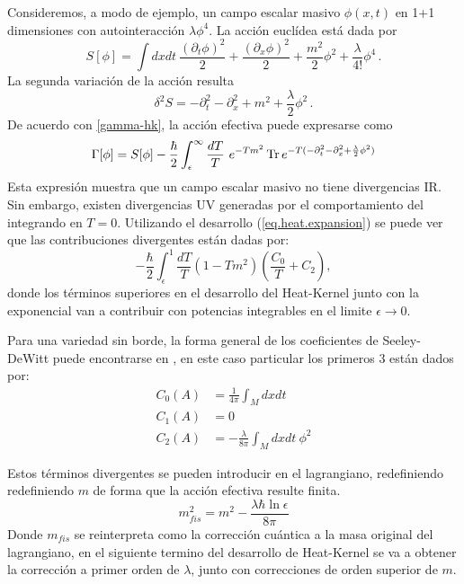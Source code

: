 Consideremos, a modo de ejemplo, un campo escalar masivo $\phi(x,t)$ en 1+1 dimensiones con autointeracción $\lambda \phi ^4 $. La acción euclídea está dada por
\begin{equation}
S[ \phi ] = \int dx dt \ 
\frac{( \partial _t \phi ) ^2}{2} +  
\frac{( \partial _x \phi ) ^2}{2} +
\frac{m ^2 }{2} \phi ^2 +
\frac{\lambda}{4!} \phi ^4 \,.
\end{equation}
La segunda variación de la acción resulta
\begin{equation}
\delta ^2 S = 
- \partial _t ^2 
- \partial _x ^2 
+ m ^2 
+ \frac{\lambda}{2}\phi ^2 \,.
\end{equation}
De acuerdo con \eqref{gamma-hk}, la acción efectiva puede expresarse como
\begin{equation}
\Gamma [ \phi ] = 
S[ \phi ] - 
\frac{\hbar }{2}
\int _ { \epsilon } ^{\infty} \frac{ dT}{T} 
\ e ^{- T m ^2 }
\,{\rm Tr} \,  e ^{- T ( - \partial _t ^2 - \partial _x ^2 + \frac{\lambda}{2} \phi ^2 ) }
\end{equation}
Esta expresión muestra que un campo escalar masivo no tiene divergencias IR. Sin embargo, existen divergencias UV generadas por el comportamiento del integrando en $T=0$. Utilizando el desarrollo (\ref{eq.heat.expansion}) se puede ver que las contribuciones divergentes están dadas por:
\begin{equation}
- \frac{\hbar }{2}\int _ { \epsilon } ^{1}  
\frac{ dT}{T} 
\left(
		1 - T m^2
		\right)
\left(
		\frac{C _0}{T} + C _2 
		\right),
\end{equation}
donde los términos superiores en el  desarrollo del Heat-Kernel junto con la exponencial van a contribuir con potencias integrables en el limite $\epsilon \rightarrow 0 $.

Para una variedad sin borde, la forma general de los coeficientes de Seeley-DeWitt puede encontrarse en \cite{Vassilevich2}, en este caso particular los primeros 3 están dados por:
\begin{align}
C _0 (A) &= \frac{1}{4 \pi   }  \int  _{M} d x dt   \\[2mm]
C _1 (A) &= 0 \\[2mm]
C _2 (A) &= - \frac{ \lambda }{8 \pi }  \int _M d x dt \  \phi ^2
\label{coef2}
\end{align} 



Estos términos divergentes se pueden introducir en el lagrangiano, redefiniendo redefiniendo $m$ de forma que la acción efectiva resulte finita.
\begin{equation}
m ^2 _{fis} = m ^2 - \frac{\lambda \hbar \ln \epsilon}{8 \pi}
\end{equation}
Donde $m _{fis}$ se reinterpreta como la corrección cuántica a la masa original del lagrangiano, en el siguiente termino del desarrollo de Heat-Kernel se va a obtener la corrección a primer orden de $\lambda$, junto con correcciones de orden superior de $m$.
